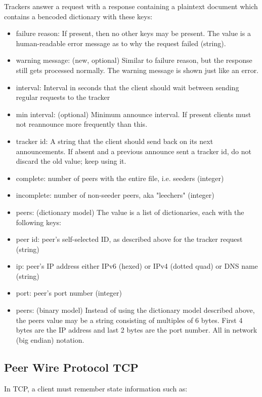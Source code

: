 \documentclass[letter]{scrartcl}
\begin{document}
Trackers answer a request with a response containing a plaintext document which contains a bencoded dictionary with these keys:
\begin{itemize}
\item failure reason: If present, then no other keys may be present. The value is a human-readable error message as to why the request failed (string).
\item warning message: (new, optional) Similar to failure reason, but the response still gets processed normally. The warning message is shown just like an error.
\item interval: Interval in seconds that the client should wait between sending regular requests to the tracker
\item min interval: (optional) Minimum announce interval. If present clients must not reannounce more frequently than this.
\item tracker id: A string that the client should send back on its next announcements. If absent and a previous announce sent a tracker id, do not discard the old value; keep using it.
\item complete: number of peers with the entire file, i.e. seeders (integer)
\item incomplete: number of non-seeder peers, aka "leechers" (integer)
\item peers: (dictionary model) The value is a list of dictionaries, each with the following keys:
\item peer id: peer's self-selected ID, as described above for the tracker request (string)
\item ip: peer's IP address either IPv6 (hexed) or IPv4 (dotted quad) or DNS name (string)
\item port: peer's port number (integer)
\item peers: (binary model) Instead of using the dictionary model described above, the peers value may be a string consisting of multiples of 6 bytes. First 4 bytes are the IP address and last 2 bytes are the port number. All in network (big endian) notation.
\end{itemize}
\subsection{Peer Wire Protocol TCP}

In TCP, a client must remember state information such as:
\end{document}
